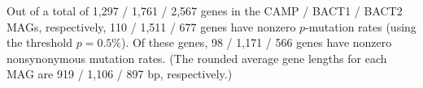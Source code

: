 Out of a total of 1,297 / 1,761 / 2,567 genes in the CAMP / BACT1 / BACT2 MAGs, respectively, 110 / 1,511 / 677 genes have nonzero $p$-mutation rates (using the threshold $p=0.5\%$). Of these genes, 98 / 1,171 / 566 genes have nonzero nonsynonymous mutation rates. (The rounded average gene lengths for each MAG are 919 / 1,106 / 897 bp, respectively.)\endinput